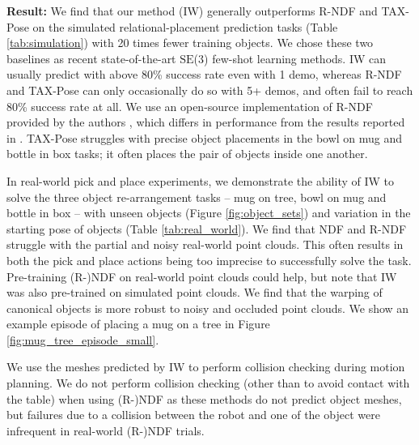\documentclass{article}
\begin{document}
\textbf{Result:} We find that our method (IW) generally outperforms R-NDF \cite{simeonov22neural} and TAX-Pose \cite{pan22taxpose} on the simulated relational-placement prediction tasks (Table \ref{tab:simulation}) with 20 times fewer training objects. We chose these two baselines as recent state-of-the-art $\mathrm{SE}$(3) few-shot learning methods.
IW can usually predict with above 80\% success rate even with 1 demo, whereas R-NDF and TAX-Pose can only occasionally do so with 5+ demos, and often fail to reach 80\% success rate at all.
We use an open-source implementation of R-NDF provided by the authors \cite{rndfgithub}, which differs in performance from the results reported in \cite{simeonov22se}. TAX-Pose struggles with precise object placements in the bowl on mug and bottle in box tasks; it often places the pair of objects inside one another.

In real-world pick and place experiments, we demonstrate the ability of IW to solve the three object re-arrangement tasks -- mug on tree, bowl on mug and bottle in box -- with unseen objects (Figure \ref{fig:object_sets}) and variation in the starting pose of objects (Table \ref{tab:real_world}). We find that NDF and R-NDF \cite{simeonov22neural,simeonov22se} struggle with the partial and noisy real-world point clouds. This often results in both the pick and place actions being too imprecise to successfully solve the task. Pre-training (R-)NDF on real-world point clouds could help, but note that IW was also pre-trained on simulated point clouds. We find that the warping of canonical objects is more robust to noisy and occluded point clouds. We show an example episode of placing a mug on a tree in Figure \ref{fig:mug_tree_episode_small}.

We use the meshes predicted by IW to perform collision checking during motion planning. We do not perform collision checking (other than to avoid contact with the table) when using (R-)NDF as these methods do not predict object meshes, but failures due to a collision between the robot and one of the object were infrequent in real-world (R-)NDF trials.

\end{document}
